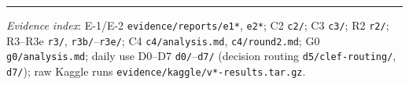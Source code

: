 \documentclass[
  10pt,
]{article}
\begin{document}
\begin{center}\rule{0.5\linewidth}{0.5pt}\end{center}

\emph{Evidence index}: E-1/E-2 \texttt{evidence/reports/e1*},
\texttt{e2*}; C2 \texttt{c2/}; C3 \texttt{c3/}; R2 \texttt{r2/}; R3--R3e
\texttt{r3/}, \texttt{r3b/}--\texttt{r3e/}; C4 \texttt{c4/analysis.md},
\texttt{c4/round2.md}; G0 \texttt{g0/analysis.md}; daily use D0--D7
\texttt{d0/}--\texttt{d7/} (decision routing \texttt{d5/clef-routing/},
\texttt{d7/}); raw Kaggle runs
\texttt{evidence/kaggle/v*-results.tar.gz}.
\end{document}
